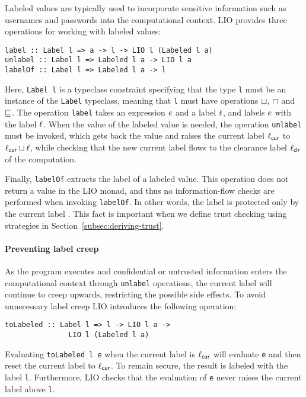Labeled values are typically used to incorporate sensitive information such as usernames and passwords into the computational context. LIO provides three operations for working with labeled values:
\begin{verbatim}
label :: Label l => a -> l -> LIO l (Labeled l a)
unlabel :: Label l => Labeled l a -> LIO l a
labelOf :: Label l => Labeled l a -> l
\end{verbatim}
Here, \texttt{Label l} is a typeclass constraint specifying that the type \texttt{l} must be an instance of the \texttt{Label} typeclass, meaning that \texttt{l} must have operations $\sqcup$, $\sqcap$ and $\sqsubseteq$. The operation \texttt{label} takes an expression $e$ and a label $\ell$, and labels $e$ with the label $\ell$. When the value of the labeled value is needed, the operation \texttt{unlabel} must be invoked, which gets back the value and raises the current label $\ell_{\mathsf{cur}}$ to $\ell_{\mathsf{cur}} \sqcup \ell$, while checking that the new current label flows to the clearance label $\ell_{\mathsf{clr}}$ of the computation.

Finally, \texttt{labelOf} extracts the label of a labeled value. This operation does not return a value in the LIO monad, and thus no information-flow checks are performed when invoking \texttt{labelOf}. In other words, the label is protected only by the current label \cite{SRMMlio}. This fact is important when we define trust checking using strategies in Section~\ref{subsec:deriving-trust}.

\paragraph{Preventing label creep}
As the program executes and confidential or untrusted information enters the computational context through \texttt{unlabel} operations, the current label will continue to creep upwards, restricting the possible side effects. To avoid unnecessary label creep LIO introduces the following operation:
\begin{verbatim}
toLabeled :: Label l => l -> LIO l a ->
               LIO l (Labeled l a)
\end{verbatim}
Evaluating \texttt{toLabeled l e} when the current label is $\ell_{\mathsf{cur}}$ will evaluate \texttt{e} and then reset the current label to $\ell_{\mathsf{cur}}$. To remain secure, the result is labeled with the label \texttt{l}. Furthermore, LIO checks that the evaluation of \texttt{e} never raises the current label above \texttt{l}.